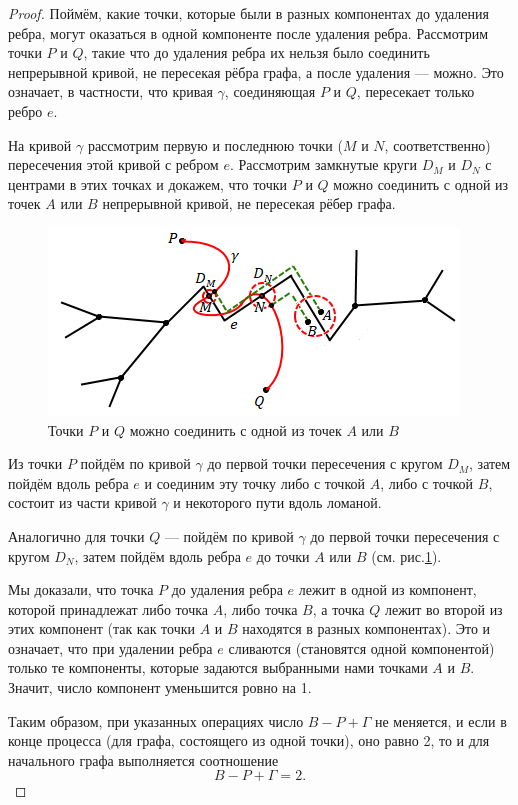 \begin{proof}
    Поймём, какие точки, которые были в разных компонентах до удаления ребра, могут оказаться в одной компоненте после удаления ребра. Рассмотрим точки $P$ и $Q$, такие что до удаления ребра их нельзя было соединить непрерывной кривой, не пересекая рёбра графа, а после удаления — можно. Это означает, в частности, что кривая $\gamma$, соединяющая $P$ и $Q$, пересекает только ребро $e$.

    На кривой $\gamma$ рассмотрим первую и последнюю точки ($M$ и $N$, соответственно) пересечения этой кривой с ребром $e$. Рассмотрим замкнутые круги $D_M$ и $D_N$ с центрами в этих точках и докажем, что точки $P$ и $Q$ можно соединить с одной из точек $A$ или $B$ непрерывной кривой, не пересекая рёбер графа.

    \begin{figure}[h]
        \centering
        \includegraphics[scale=0.8]{images/c6.3.png}
        \caption{Точки $P$ и $Q$ можно соединить с одной из точек $A$ или $B$}
        \label{fig:c6.3}
    \end{figure}

    Из точки $P$ пойдём по кривой $\gamma$ до первой точки пересечения с кругом $D_M$, затем пойдём вдоль ребра $e$ и соединим эту точку либо с точкой $A$, либо с точкой $B$, состоит из части кривой $\gamma$ и некоторого пути вдоль ломаной.

    Аналогично для точки $Q$ — пойдём по кривой $\gamma$ до первой точки пересечения с кругом $D_N$, затем пойдём вдоль ребра $e$ до точки $A$ или $B$ (см. рис.\ref{fig:c6.3}).

    Мы доказали, что точка $P$ до удаления ребра $e$ лежит в одной из компонент, которой принадлежат либо точка $A$, либо точка $B$, а точка $Q$ лежит во второй из этих компонент (так как точки $A$ и $B$ находятся в разных компонентах). Это и означает, что при удалении ребра $e$ сливаются (становятся одной компонентой) только те компоненты, которые задаются выбранными нами точками $A$ и $B$. Значит, число компонент уменьшится ровно на 1.

    Таким образом, при указанных операциях число $B - P + \Gamma$ не меняется, и если в конце процесса (для графа, состоящего из одной точки), оно равно 2, то и для начального графа выполняется соотношение
    \[B - P + \Gamma = 2.\]
\end{proof}


